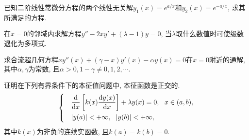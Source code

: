 \begin{yyEx}
	已知二阶线性常微分方程的两个线性无关解$y_1(x) = e^{a/x}$和$y_2(x) = e^{-a/x}$, 求其所满足的方程.
\end{yyEx}

\begin{yyEx}
	在$x = 0$的邻域内求解方程$y'' - 2xy' + (\lambda-1)y = 0$, 当$\lambda$取什么数值时可使级数退化为多项式.
\end{yyEx}

\begin{yyEx}
	求合流超几何方程$xy''(x)+(\gamma -x)y'(x) - \alpha y(x) = 0$在$x = 0$附近的通解, 其中$\alpha,\gamma$为常数, 且$\alpha>0,1-\gamma\neq 0,1,2,\cdots$.
\end{yyEx}

\begin{yyEx}
	证明在下列有界条件下的本征值问题中, 本征函数是正交的.
	\begin{equation*}
		\begin{dcases}
			&\frac{\mathrm{d}}{\mathrm{d}x}\left[ k(x)\frac{\mathrm{d}y(x)}{\mathrm{d}x} \right] + \lambda y(x) = 0,~~x\in(a,b), \\
			&\lvert y(a)\rvert<+\infty,~~\lvert y(b)\rvert<+\infty,
		\end{dcases}
	\end{equation*}
	其中$k(x)$为非负的连续实函数, 且$k(a) = k(b) = 0$.
\end{yyEx}